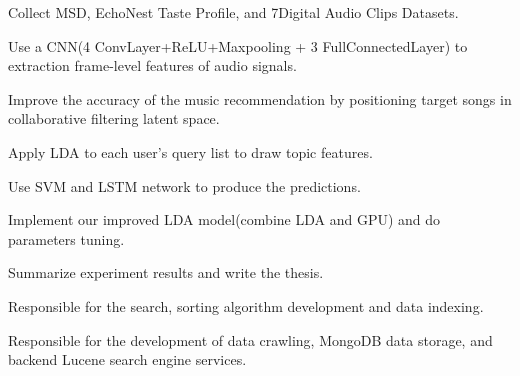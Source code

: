 \documentclass[]{deedy-resume-openfont}
\begin{document}
\begin{minipage}[t]{0.69\textwidth}
\sectionsep %

\begin{tightemize}
\item Collect MSD, EchoNest Taste Profile, and 7Digital Audio Clips Datasets.
\item Use a CNN(4 ConvLayer+ReLU+Maxpooling + 3 FullConnectedLayer) to extraction frame-level features of audio signals.
\item Improve the accuracy of the music recommendation by positioning target songs in collaborative filtering latent space.
\end{tightemize}

\sectionsep %

\begin{tightemize}
\item Apply LDA to each user's query list to draw topic features.
\item Use SVM and LSTM network to produce the predictions.
\end{tightemize}

\sectionsep %

\begin{tightemize}
\item Implement our improved LDA model(combine LDA and GPU) and do parameters tuning.
\item Summarize experiment results and write the thesis.
\end{tightemize}

\sectionsep %

\begin{tightemize}
\item Responsible for the search, sorting algorithm development and data indexing.
\item Responsible for the development of data crawling, MongoDB data storage, and backend Lucene search engine services.
\end{tightemize}

\sectionsep %


\end{minipage}
\end{document}
